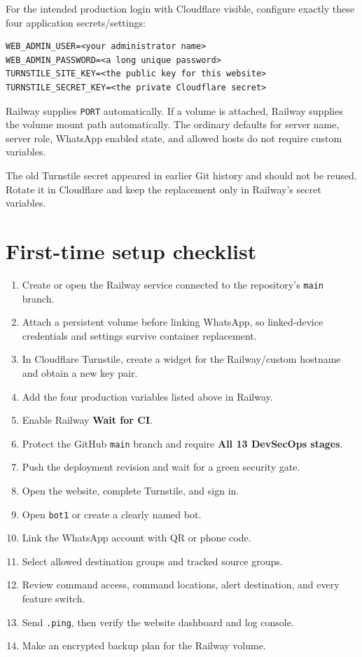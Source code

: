 \documentclass[11pt,a4paper]{article}
\begin{document}
For the intended production login with Cloudflare visible, configure exactly these four application secrets/settings:

\begin{lstlisting}
WEB_ADMIN_USER=<your administrator name>
WEB_ADMIN_PASSWORD=<a long unique password>
TURNSTILE_SITE_KEY=<the public key for this website>
TURNSTILE_SECRET_KEY=<the private Cloudflare secret>
\end{lstlisting}

Railway supplies \texttt{PORT} automatically. If a volume is attached, Railway supplies the volume mount path automatically. The ordinary defaults for server name, server role, WhatsApp enabled state, and allowed hosts do not require custom variables.

The old Turnstile secret appeared in earlier Git history and should not be reused. Rotate it in Cloudflare and keep the replacement only in Railway's secret variables.

\section{First-time setup checklist}

\begin{enumerate}
  \item Create or open the Railway service connected to the repository's \texttt{main} branch.
  \item Attach a persistent volume before linking WhatsApp, so linked-device credentials and settings survive container replacement.
  \item In Cloudflare Turnstile, create a widget for the Railway/custom hostname and obtain a new key pair.
  \item Add the four production variables listed above in Railway.
  \item Enable Railway \textbf{Wait for CI}.
  \item Protect the GitHub \texttt{main} branch and require \textbf{All 13 DevSecOps stages}.
  \item Push the deployment revision and wait for a green security gate.
  \item Open the website, complete Turnstile, and sign in.
  \item Open \texttt{bot1} or create a clearly named bot.
  \item Link the WhatsApp account with QR or phone code.
  \item Select allowed destination groups and tracked source groups.
  \item Review command access, command locations, alert destination, and every feature switch.
  \item Send \texttt{.ping}, then verify the website dashboard and log console.
  \item Make an encrypted backup plan for the Railway volume.
\end{enumerate}
\end{document}
